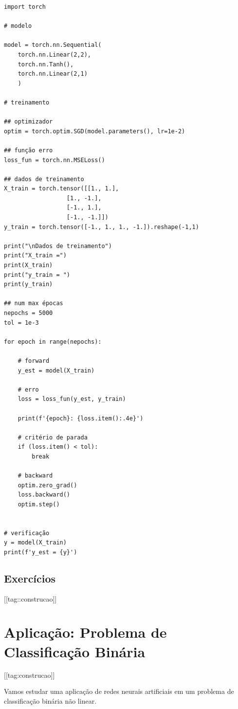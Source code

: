 % 
\begin{lstlisting}[caption=mlp\_xor.py, label=cap_mlp_sec_modelo:cod:mlp_xor]
import torch

# modelo

model = torch.nn.Sequential(
    torch.nn.Linear(2,2),
    torch.nn.Tanh(),
    torch.nn.Linear(2,1)
    )

# treinamento

## optimizador
optim = torch.optim.SGD(model.parameters(), lr=1e-2)

## função erro
loss_fun = torch.nn.MSELoss()

## dados de treinamento
X_train = torch.tensor([[1., 1.],
                  [1., -1.],
                  [-1., 1.],
                  [-1., -1.]])
y_train = torch.tensor([-1., 1., 1., -1.]).reshape(-1,1)

print("\nDados de treinamento")
print("X_train =")
print(X_train)
print("y_train = ")
print(y_train)

## num max épocas
nepochs = 5000
tol = 1e-3

for epoch in range(nepochs):

    # forward
    y_est = model(X_train)

    # erro
    loss = loss_fun(y_est, y_train)

    print(f'{epoch}: {loss.item():.4e}')

    # critério de parada
    if (loss.item() < tol):
        break

    # backward
    optim.zero_grad()
    loss.backward()
    optim.step()


# verificação
y = model(X_train)
print(f'y_est = {y}')
\end{lstlisting}

\subsection{Exercícios}

[[tag::construcao]]

\section{Aplicação: Problema de Classificação Binária}\label{cap_mlp_sec_classbin}

[[tag:construcao]]

Vamos estudar uma aplicação de redes neurais artificiais em um problema de classificação binária não linear.

